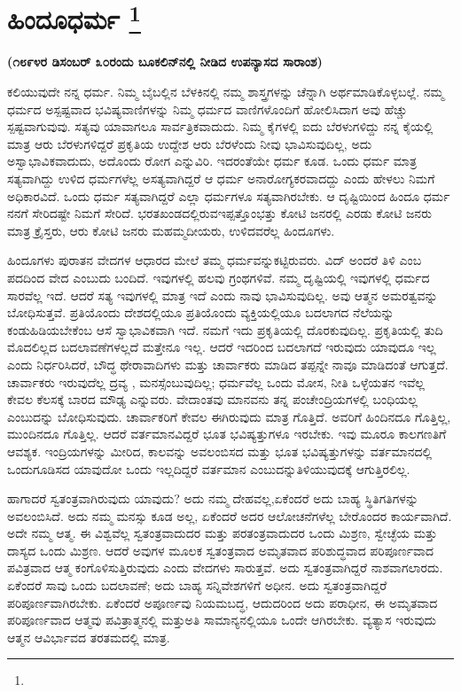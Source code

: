 
\chapter[ಹಿಂದೂಧರ್ಮ ]{ಹಿಂದೂಧರ್ಮ \protect\footnote{}}

\centerline{\textbf{(೧೮೯೪ರ ಡಿಸಂಬರ್​ ೩೦ರಂದು ಬೂಕಲಿನ್​ನಲ್ಲಿ ನೀಡಿದ ಉಪನ್ಯಾಸದ ಸಾರಾಂಶ)}}

ಕಲಿಯುವುದೇ ನನ್ನ ಧರ್ಮ. ನಿಮ್ಮ ಬೈಬಲ್ಲಿನ ಬೆಳಕಿನಲ್ಲಿ ನಮ್ಮ ಶಾಸ್ತ್ರಗಳನ್ನು ಚೆನ್ನಾಗಿ ಅರ್ಥಮಾಡಿಕೊಳ್ಳಬಲ್ಲೆ. ನಮ್ಮ ಧರ್ಮದ ಅಸ್ಪಷ್ಟವಾದ ಭವಿಷ್ಯವಾಣಿಗಳನ್ನು ನಿಮ್ಮ ಧರ್ಮದ ವಾಣಿಗಳೊಂದಿಗೆ ಹೋಲಿಸಿದಾಗ ಅವು ಹೆಚ್ಚು ಸ್ಪಷ್ಟವಾಗುವುವು. ಸತ್ಯವು ಯಾವಾಗಲೂ ಸಾರ್ವತ್ರಿಕವಾದುದು. ನಿಮ್ಮ ಕೈಗಳಲ್ಲಿ ಐದು ಬೆರಳುಗಳಿದ್ದು ನನ್ನ ಕೈಯಲ್ಲಿ ಮಾತ್ರ ಆರು ಬೆರಳುಗಳಿದ್ದರೆ ಪ್ರಕೃತಿಯ ಉದ್ದೇಶ ಆರು ಬೆರಳೆಂದು ನೀವು ಭಾವಿಸುವುದಿಲ್ಲ, ಅದು ಅಸ್ವಾಭಾವಿಕವಾದುದು, ಅದೊಂದು ರೋಗ ಎನ್ನುವಿರಿ. ಇದರಂತೆಯೇ ಧರ್ಮ ಕೂಡ. ಒಂದು ಧರ್ಮ ಮಾತ್ರ ಸತ್ಯವಾಗಿದ್ದು ಉಳಿದ ಧರ್ಮಗಳೆಲ್ಲ ಅಸತ್ಯವಾಗಿದ್ದರೆ ಆ ಧರ್ಮ ಅನಾರೋಗ್ಯಕರವಾದದ್ದು ಎಂದು ಹೇಳಲು ನಿಮಗೆ ಅಧಿಕಾರವಿದೆ. ಒಂದು ಧರ್ಮ ಸತ್ಯವಾಗಿದ್ದರೆ ಎಲ್ಲಾ ಧರ್ಮಗಳೂ ಸತ್ಯವಾಗಿರಬೇಕು. ಆ ದೃಷ್ಟಿಯಿಂದ ಹಿಂದೂ ಧರ್ಮ ನನಗೆ ಸೇರಿದಷ್ಟೇ ನಿಮಗೆ ಸೇರಿದೆ. ಭರತಖಂಡದಲ್ಲಿರುವ\break ಇಪ್ಪತ್ತೊಂಭತ್ತು ಕೋಟಿ ಜನರಲ್ಲಿ ಎರಡು ಕೋಟಿ ಜನರು ಮಾತ್ರ ಕ್ರೈಸ್ತರು, ಆರು ಕೋಟಿ ಜನರು ಮಹಮ್ಮದೀಯರು, ಉಳಿದವರೆಲ್ಲ ಹಿಂದೂಗಳು.

ಹಿಂದೂಗಳು ಪುರಾತನ ವೇದಗಳ ಆಧಾರದ ಮೇಲೆ ತಮ್ಮ ಧರ್ಮವನ್ನು\break ಕಟ್ಟಿರುವರು. ವಿದ್​ ಅಂದರೆ ತಿಳಿ ಎಂಬ ಪದದಿಂದ ವೇದ ಎಂಬುದು ಬಂದಿದೆ. ಇವುಗಳಲ್ಲಿ ಹಲವು ಗ್ರಂಥಗಳಿವೆ. ನಮ್ಮ ದೃಷ್ಟಿಯಲ್ಲಿ ಇವುಗಳಲ್ಲಿ ಧರ್ಮದ ಸಾರವೆಲ್ಲ ಇದೆ. ಆದರೆ ಸತ್ಯ ಇವುಗಳಲ್ಲಿ ಮಾತ್ರ ಇದೆ ಎಂದು ನಾವು ಭಾವಿಸುವುದಿಲ್ಲ. ಅವು ಆತ್ಮನ ಅಮರತ್ವವನ್ನು ಬೋಧಿಸುತ್ತವೆ. ಪ್ರತಿಯೊಂದು ದೇಶದಲ್ಲಿಯೂ ಪ್ರತಿಯೊಂದು ವ್ಯಕ್ತಿಯಲ್ಲಿಯೂ ಬದಲಾಗದ ನೆಲೆಯನ್ನು ಕಂಡುಹಿಡಿಯಬೇಕೆಂಬ ಆಸೆ ಸ್ವಾಭಾವಿಕವಾಗಿ ಇದೆ. ನಮಗೆ ಇದು ಪ್ರಕೃತಿಯಲ್ಲಿ ದೊರಕುವುದಿಲ್ಲ. ಪ್ರಕೃತಿಯಲ್ಲಿ ತುದಿ ಮೊದಲಿಲ್ಲದ ಬದಲಾವಣೆಗಳಲ್ಲದೆ ಮತ್ತೇನೂ ಇಲ್ಲ. ಆದರೆ ಇದರಿಂದ ಬದಲಾಗದೆ ಇರುವುದು ಯಾವುದೂ ಇಲ್ಲ ಎಂದು ನಿರ್ಧರಿಸಿದರೆ, ಬೌದ್ಧ ಥೇರಾವಾದಿಗಳು ಮತ್ತು ಚಾರ್ವಾಕರು ಮಾಡಿದ ತಪ್ಪನ್ನೇ ನಾವೂ ಮಾಡಿದಂತೆ ಆಗುತ್ತದೆ. ಚಾರ್ವಾಕರು ಇರುವುದೆಲ್ಲ ದ್ರವ್ಯ , ಮನಸ್ಸೆಂಬುವುದಿಲ್ಲ; ಧರ್ಮವೆಲ್ಲ ಒಂದು ಮೋಸ, ನೀತಿ ಒಳ್ಳೆಯತನ ಇವೆಲ್ಲ ಕೇವಲ ಕೆಲಸಕ್ಕೆ ಬಾರದ ಮೌಢ್ಯ ಎನ್ನುವರು. ವೇದಾಂತವು ಮಾನವನು ತನ್ನ ಪಂಚೇಂದ್ರಿಯಗಳಲ್ಲಿ ಬಂಧಿಯಲ್ಲ ಎಂಬುದನ್ನು ಬೋಧಿಸುವುದು. ಚಾರ್ವಾಕರಿಗೆ ಕೇವಲ ಈಗಿರುವುದು ಮಾತ್ರ ಗೊತ್ತಿದೆ. ಅವರಿಗೆ ಹಿಂದಿನದೂ ಗೊತ್ತಿಲ್ಲ, ಮುಂದಿನದೂ ಗೊತ್ತಿಲ್ಲ. ಆದರೆ ವರ್ತಮಾನವಿದ್ದರೆ ಭೂತ ಭವಿಷ್ಯತ್ತುಗಳೂ ಇರಬೇಕು. ಇವು ಮೂರೂ ಕಾಲಗಣತಿಗೆ ಆವಶ್ಯಕ. ಇಂದ್ರಿಯಗಳನ್ನು ಮೀರಿದ, ಕಾಲವನ್ನು ಅವಲಂಬಿಸದ ಮತ್ತು ಭೂತ ಭವಿಷ್ಯತ್ತುಗಳನ್ನು ವರ್ತಮಾನದಲ್ಲಿ ಒಂದುಗೂಡಿಸದ ಯಾವುದೋ ಒಂದು ಇಲ್ಲದಿದ್ದರೆ ವರ್ತಮಾನ ಎಂಬುದನ್ನು\break ತಿಳಿಯುವುದಕ್ಕೆ ಆಗುತ್ತಿರಲಿಲ್ಲ.

ಹಾಗಾದರೆ ಸ್ವತಂತ್ರವಾಗಿರುವುದು ಯಾವುದು? ಅದು ನಮ್ಮ ದೇಹವಲ್ಲ,\break ಏಕೆಂದರೆ ಅದು ಬಾಹ್ಯ ಸ್ಥಿತಿಗತಿಗಳನ್ನು ಅವಲಂಬಿಸಿದೆ. ಅದು ನಮ್ಮ ಮನಸ್ಸು ಕೂಡ ಅಲ್ಲ, ಏಕೆಂದರೆ ಅದರ ಆಲೋಚನೆಗಳೆಲ್ಲ ಬೇರೊಂದರ ಕಾರ್ಯವಾಗಿದೆ. ಅದೇ ನಮ್ಮ ಆತ್ಮ. ಈ ವಿಶ್ವವೆಲ್ಲ ಸ್ವತಂತ್ರವಾದುದರ ಮತ್ತು ಪರತಂತ್ರವಾದುದರ ಒಂದು ಮಿಶ್ರಣ, ಸ್ವೇಚ್ಛೆಯ ಮತ್ತು ದಾಸ್ಯದ ಒಂದು ಮಿಶ್ರಣ. ಆದರೆ ಅವುಗಳ ಮೂಲಕ ಸ್ವತಂತ್ರವಾದ ಅಮೃತವಾದ ಪರಿಶುದ್ಧವಾದ ಪರಿಪೂರ್ಣವಾದ ಪವಿತ್ರವಾದ ಆತ್ಮ ಕಂಗೊಳಿಸುತ್ತಿರುವುದು ಎಂದು ವೇದಗಳು ಸಾರುತ್ತವೆ. ಅದು ಸ್ವತಂತ್ರವಾಗಿದ್ದರೆ ನಾಶವಾಗಲಾರದು. ಏಕೆಂದರೆ ಸಾವು ಒಂದು ಬದಲಾವಣೆ; ಅದು ಬಾಹ್ಯ ಸನ್ನಿವೇಶಗಳಿಗೆ ಅಧೀನ. ಅದು ಸ್ವತಂತ್ರವಾಗಿದ್ದರೆ ಪರಿಪೂರ್ಣವಾಗಿರಬೇಕು. ಏಕೆಂದರೆ ಅಪೂರ್ಣವು ನಿಯಮಬದ್ಧ, ಆದುದರಿಂದ ಅದು ಪರಾಧೀನ, ಈ ಅಮೃತವಾದ ಪರಿಪೂರ್ಣವಾದ ಆತ್ಮವು ಪವಿತ್ರಾತ್ಮನಲ್ಲಿ ಮತ್ತು\break ಅತಿ ಸಾಮಾನ್ಯನಲ್ಲಿಯೂ ಒಂದೇ ಆಗಿರಬೇಕು. ವ್ಯತ್ಯಾಸ ಇರುವುದು ಆತ್ಮನ ಆವಿರ್ಭಾವದ ತರತಮದಲ್ಲಿ ಮಾತ್ರ.

